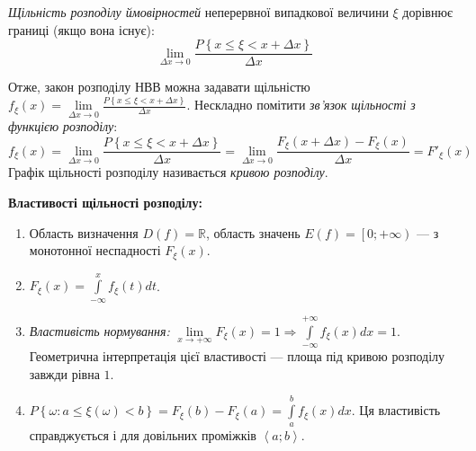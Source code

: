 \begin{definition}
    \emph{Щільність розподілу ймовірностей} неперервної випадкової величини $\xi$
    дорівнює границі (якщо вона існує):
    \begin{equation}\label{eq:prob_dens}
        \lim_{\Delta x\rightarrow 0} \frac{P\left\{x\leq \xi < x+\Delta x\right\}}{\Delta x}
    \end{equation}
\end{definition}
Отже, закон розподілу НВВ можна задавати щільністю $f_\xi(x) = \lim\limits_{\Delta x\rightarrow 0} \frac{P\left\{x\leq \xi < x+\Delta x\right\}}{\Delta x}$.
Нескладно помітити \emph{зв'язок щільності з функцією розподілу}:
\begin{equation}\label{eq:dens_pdf}
    f_\xi(x) = \lim\limits_{\Delta x\rightarrow 0} \frac{P\left\{x\leq \xi < x+\Delta x\right\}}{\Delta x} = 
    \lim\limits_{\Delta x\rightarrow 0} \frac{F_\xi(x+\Delta x) - F_\xi(x)}{\Delta x} = F'_\xi(x)
\end{equation}
Графік щільності розподілу називається \emph{кривою розподілу}.

\noindent \textbf{Властивості щільності розподілу:}
\begin{enumerate}
    \item Область визначення $D(f) = \mathbb{R}$, область значень $E(f) = \left[0; +\infty\right)$ --- з монотонної неспадності $F_\xi(x)$.
    \item $F_\xi(x)=\int\limits_{-\infty}^x f_\xi(t)dt$.
    \item \emph{Властивість нормування:} $\lim\limits_{x \to +\infty} F_\xi(x) = 1 \Rightarrow \int\limits_{-\infty}^{+\infty} f_\xi(x)dx = 1$.
    Геометрична інтерпретація цієї властивості --- площа під кривою розподілу завжди рівна $1$.
    \item $P\left\{\omega: a \leq \xi(\omega) < b\right\} = F_\xi(b) - F_\xi(a) = \int\limits_a^b f_\xi(x)dx$.
    Ця властивість справджується і для довільних проміжків $\left< a; b\right>$.
\end{enumerate}

